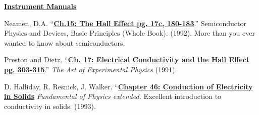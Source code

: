 \documentclass{../lab}
\newcommand{\InstrumentManuals}{http://experimentationlab.berkeley.edu/node/106}
\newcommand{\ChFifteenTheHallEffect}{http://physics111.lib.berkeley.edu/Physics111/Reprints/SHE/09-Semiconductors.pdf}
\newcommand{\ChSeventeenElectricalConductivityandtheHallEffect}{http://physics111.lib.berkeley.edu/Physics111/Reprints/SHE/07-Electrical_Conductivity.pdf}
\newcommand{\ChapterFortySixConductionofElectricity}{http://physics111.lib.berkeley.edu/Physics111/Reprints/SHE/Halliday_Resnick/Ch.\%2046\%20Conduction\%20of\%20electricity\%20in\%20solids.pdf}
\begin{document}
\begin{thebibliography}{}
\label{references}
\href{\InstrumentManuals}{\textbf{Instrument Manuals}}

Neamen, D.A. ``\href{\ChFifteenTheHallEffect}{\textbf{Ch.15: The Hall Effect pg. 17c, 180-183}}.'' Semiconductor Physics and Devices, Basic Principles (Whole Book). (1992). More than you ever wanted to know about semiconductors.

Preston and Dietz. ``\href{\ChSeventeenElectricalConductivityandtheHallEffect}{\textbf{Ch. 17: Electrical Conductivity and the Hall Effect pg. 303-315}}.'' \emph{The Art of Experimental Physics} (1991).

D. Halliday, R. Resnick, J. Walker. ``\href{\ChapterFortySixConductionofElectricity}{\textbf{Chapter 46: Conduction of Electricity in Solids}} \emph{Fundamental of Physics extended.} Excellent introduction to conductivity in solids. (1993).
\end{thebibliography}
\end{document}
